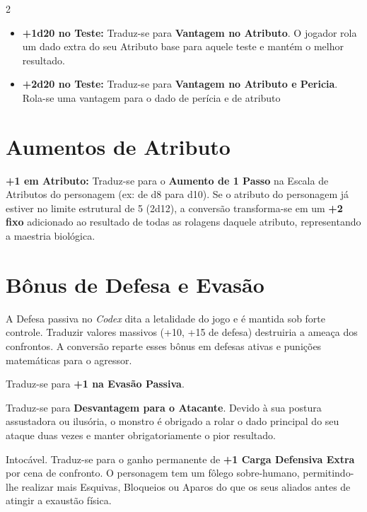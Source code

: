 \documentclass[a4paper,11pt,openany]{book}
\begin{document}
\begin{multicols}{2}
\begin{itemize}
    \item \textbf{+1d20 no Teste:} Traduz-se para \textbf{Vantagem no Atributo}. O jogador rola um dado extra do seu Atributo base para aquele teste e mantém o melhor resultado.
    \item \textbf{+2d20 no Teste:} Traduz-se para \textbf{Vantagem no Atributo e Pericia}. Rola-se uma vantagem para o dado de perícia e de atributo
\end{itemize}

\section{Aumentos de Atributo}

\begin{regra}
\textbf{+1 em Atributo:} Traduz-se para o \textbf{Aumento de 1 Passo} na Escala de Atributos do personagem (ex: de d8 para d10). Se o atributo do personagem já estiver no limite estrutural de 5 (2d12), a conversão transforma-se em um \textbf{+2 fixo} adicionado ao resultado de todas as rolagens daquele atributo, representando a maestria biológica.
\end{regra}

\section{Bônus de Defesa e Evasão}

A Defesa passiva no \textit{Codex} dita a letalidade do jogo e é mantida sob forte controle. Traduzir valores massivos (+10, +15 de defesa) destruiria a ameaça dos confrontos. A conversão reparte esses bônus em defesas ativas e punições matemáticas para o agressor.

\begin{description}[font=\sffamily\bfseries\color{CodexRed}]
    \item[+2 na Defesa:] Traduz-se para \textbf{+1 na Evasão Passiva}.
    
    \item[+5 na Defesa:] Traduz-se para \textbf{Desvantagem para o Atacante}. Devido à sua postura assustadora ou ilusória, o monstro é obrigado a rolar o dado principal do seu ataque duas vezes e manter obrigatoriamente o pior resultado.
    
    \item[+10 na Defesa:] Intocável. Traduz-se para o ganho permanente de \textbf{+1 Carga Defensiva Extra} por cena de confronto. O personagem tem um fôlego sobre-humano, permitindo-lhe realizar mais Esquivas, Bloqueios ou Aparos do que os seus aliados antes de atingir a exaustão física.
\end{description}


\end{multicols}
\end{document}
